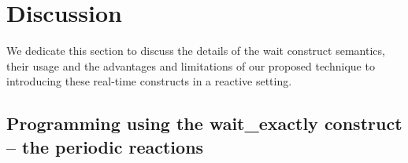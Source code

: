 \section{Discussion}
\label{sec:disc-perc-limit}

We dedicate this section to discuss the details of the wait construct
semantics, their usage and the advantages and limitations of our
proposed technique to introducing these real-time constructs in a
reactive setting.

\subsection{Programming using the wait\_exactly construct -- the
  periodic reactions}
\label{sec:progr-using-delay}








